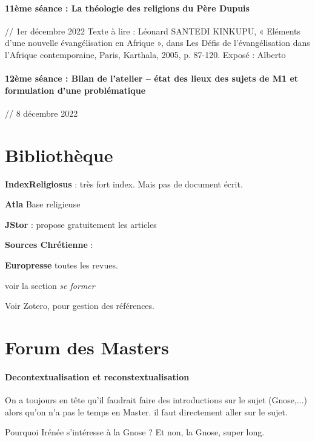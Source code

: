 \paragraph{11ème séance : La théologie des religions du Père Dupuis} // 1er décembre 2022
Texte à lire : Léonard SANTEDI KINKUPU, « Eléments d’une nouvelle évangélisation en Afrique », dans Les Défis de l’évangélisation dans l’Afrique contemporaine, Paris, Karthala, 2005, p. 87-120.
Exposé : Alberto

\paragraph{12ème séance : Bilan de l’atelier – état des lieux des sujets de M1 et formulation d’une problématique} // 8 décembre 2022



\section{Bibliothèque}
 
 
 \textbf{IndexReligiosus} : très fort index.  Mais pas de document écrit.
 
 \textbf{Atla} Base religieuse
 
 \textbf{JStor} : propose gratuitement les articles 

 \textbf{Sources Chrétienne} :
 
 \textbf{Europresse} toutes les revues.
 
 
 \begin{Synthesis}
 voir la section \textit{se former}
 
 \end{Synthesis}

Voir Zotero, pour gestion des références.


\section{Forum des Masters}


\paragraph{Decontextualisation et reconstextualisation}
On a toujours en tête qu'il faudrait faire des introductions sur le sujet (Gnose,...) alors qu'on n'a pas le temps en Master. il faut directement aller sur le sujet. 
\begin{Ex}
    Pourquoi Irénée s'intéresse à la Gnose ? Et non, la Gnose, super long.
\end{Ex}

